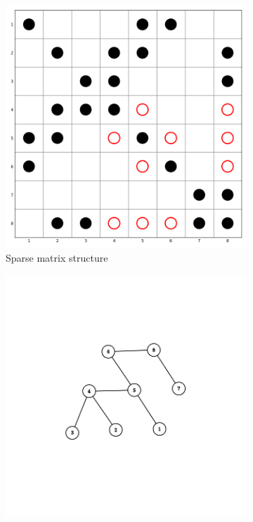\begin{figure}[htbp]
    \centering
    \begin{subfigure}[b]{0.45\textwidth}
        \centering
        \includegraphics[width=\textwidth]{fig/background/etree-1.png}
        \caption{Sparse matrix structure}
        \label{fig:etree-matrix}
    \end{subfigure}
    \hfill
    \begin{subfigure}[b]{0.45\textwidth}
        \centering
        \vspace{0.5cm}
        \includegraphics[width=1\textwidth]{fig/background/etree-2.png}

\end{subfigure}
\end{figure}
